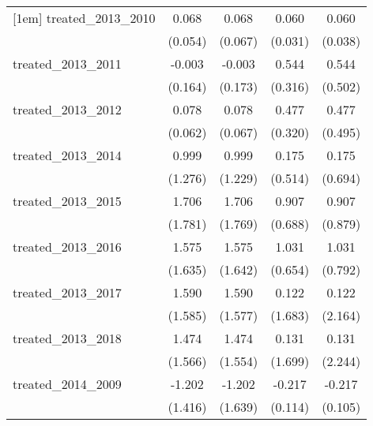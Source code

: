 {\begin{tabular}{l*{4}{c}}
[1em]
treated\_2013\_2010&       0.068         &       0.068         &       0.060\sym{*}  &       0.060         \\
            &     (0.054)         &     (0.067)         &     (0.031)         &     (0.038)         \\
[1em]
treated\_2013\_2011&      -0.003         &      -0.003         &       0.544         &       0.544         \\
            &     (0.164)         &     (0.173)         &     (0.316)         &     (0.502)         \\
[1em]
treated\_2013\_2012&       0.078         &       0.078         &       0.477         &       0.477         \\
            &     (0.062)         &     (0.067)         &     (0.320)         &     (0.495)         \\
[1em]
treated\_2013\_2014&       0.999         &       0.999         &       0.175         &       0.175         \\
            &     (1.276)         &     (1.229)         &     (0.514)         &     (0.694)         \\
[1em]
treated\_2013\_2015&       1.706         &       1.706         &       0.907         &       0.907         \\
            &     (1.781)         &     (1.769)         &     (0.688)         &     (0.879)         \\
[1em]
treated\_2013\_2016&       1.575         &       1.575         &       1.031         &       1.031         \\
            &     (1.635)         &     (1.642)         &     (0.654)         &     (0.792)         \\
[1em]
treated\_2013\_2017&       1.590         &       1.590         &       0.122         &       0.122         \\
            &     (1.585)         &     (1.577)         &     (1.683)         &     (2.164)         \\
[1em]
treated\_2013\_2018&       1.474         &       1.474         &       0.131         &       0.131         \\
            &     (1.566)         &     (1.554)         &     (1.699)         &     (2.244)         \\
[1em]
treated\_2014\_2009&      -1.202         &      -1.202         &      -0.217         &      -0.217\sym{*}  \\
            &     (1.416)         &     (1.639)         &     (0.114)         &     (0.105)         \\

\end{tabular}}
